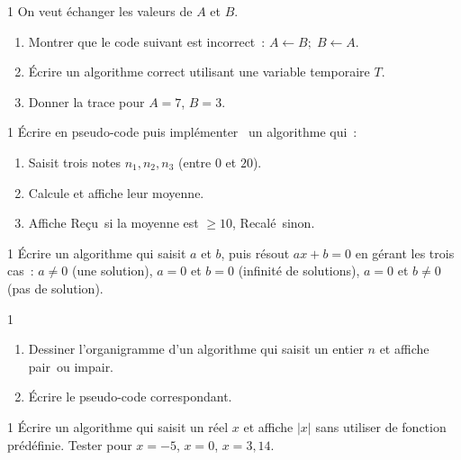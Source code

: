 \begin{exo}{1}
On veut \'echanger les valeurs de $A$ et $B$.
\begin{enumerate}
  \item Montrer que le code suivant est incorrect~:
        $A \leftarrow B ;\; B \leftarrow A$.
  \item \'Ecrire un algorithme correct utilisant une variable temporaire $T$.
  \item Donner la trace pour $A=7$, $B=3$.
\end{enumerate}
\end{exo}

\begin{exo}{1}
\'Ecrire en pseudo-code puis impl\'ementer \computer\ un algorithme qui~:
\begin{enumerate}
  \item Saisit trois notes $n_1, n_2, n_3$ (entre $0$ et $20$).
  \item Calcule et affiche leur moyenne.
  \item Affiche \og Re\c cu\fg\ si la moyenne est $\geq 10$,
        \og Recal\'e\fg\ sinon.
\end{enumerate}
\end{exo}

\begin{exo}{1}
\'Ecrire un algorithme qui saisit $a$ et $b$, puis r\'esout $ax+b=0$
en g\'erant les trois cas~: $a\ne0$ (une solution), $a=0$ et $b=0$
(infinit\'e de solutions), $a=0$ et $b\ne0$ (pas de solution).
\end{exo}

\begin{exo}{1}
\begin{enumerate}
  \item Dessiner l'organigramme d'un algorithme qui saisit
        un entier $n$ et affiche \og pair\fg\ ou \og impair\fg.
  \item \'Ecrire le pseudo-code correspondant.
\end{enumerate}
\end{exo}

\begin{exo}{1}
\'Ecrire un algorithme qui saisit un r\'eel $x$ et affiche $|x|$
sans utiliser de fonction pr\'ed\'efinie.
Tester pour $x = -5$, $x = 0$, $x = 3{,}14$.
\end{exo}


